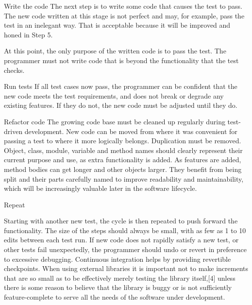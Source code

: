 \documentclass{beamer}
\begin{document}
\begin{frame}[t]{Write the code}
The next step is to write some code that causes the test to pass. The new code written at this stage is not perfect and may, for example, pass the test in an inelegant way. That is acceptable because it will be improved and honed in Step 5.
    
At this point, the only purpose of the written code is to pass the test. The programmer must not write code that is beyond the functionality that the test checks.
\end{frame}


\begin{frame}[t]{Run tests}
If all test cases now pass, the programmer can be confident that the new code meets the test requirements, and does not break or degrade any existing features. If they do not, the new code must be adjusted until they do.
    
\end{frame}


\begin{frame}[t]{Refactor code}
The growing code base must be cleaned up regularly during test-driven development. New code can be moved from where it was convenient for passing a test to where it more logically belongs. Duplication must be removed. Object, class, module, variable and method names should clearly represent their current purpose and use, as extra functionality is added. As features are added, method bodies can get longer and other objects larger. They benefit from being split and their parts carefully named to improve readability and maintainability, which will be increasingly valuable later in the software lifecycle. 
    
\end{frame}


\begin{frame}[t]{Repeat}
    
Starting with another new test, the cycle is then repeated to push forward the functionality. The size of the steps should always be small, with as few as 1 to 10 edits between each test run. If new code does not rapidly satisfy a new test, or other tests fail unexpectedly, the programmer should undo or revert in preference to excessive debugging. Continuous integration helps by providing revertible checkpoints. When using external libraries it is important not to make increments that are so small as to be effectively merely testing the library itself,[4] unless there is some reason to believe that the library is buggy or is not sufficiently feature-complete to serve all the needs of the software under development.
\end{frame}
\end{document}
